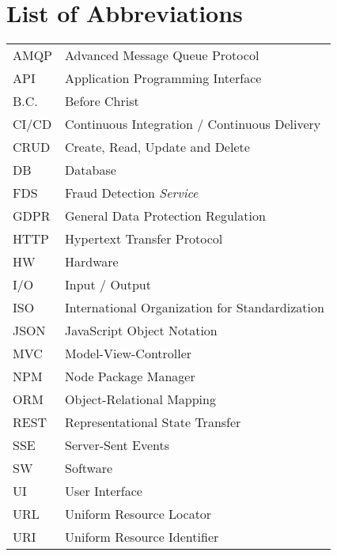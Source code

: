 
\chapter{List of Abbreviations}

\begin{tabularx}{\linewidth}{p{} p{}}
  AMQP & Advanced Message Queue Protocol \\ 
  API & Application Programming Interface \\ 
  B.C. & Before Christ \\ 
  CI/CD & Continuous Integration / Continuous Delivery \\ 
  CRUD & Create, Read, Update and Delete \\
  DB & Database \\
  FDS & Fraud Detection \emph{Service} \\ 
  GDPR & General Data Protection Regulation \\
  HTTP & Hypertext Transfer Protocol \\ 
  HW & Hardware \\ 
  I/O & Input / Output \\
  ISO & International Organization for Standardization \\
  JSON & JavaScript Object Notation \\ 
  MVC & Model-View-Controller \\ 
  NPM & Node Package Manager \\
  ORM & Object-Relational Mapping \\ 
  REST & Representational State Transfer \\ 
  SSE & Server-Sent Events \\ 
  SW & Software \\ 
  UI & User Interface \\ 
  URL & Uniform Resource Locator \\ 
  URI & Uniform Resource Identifier \\ 
\end{tabularx}